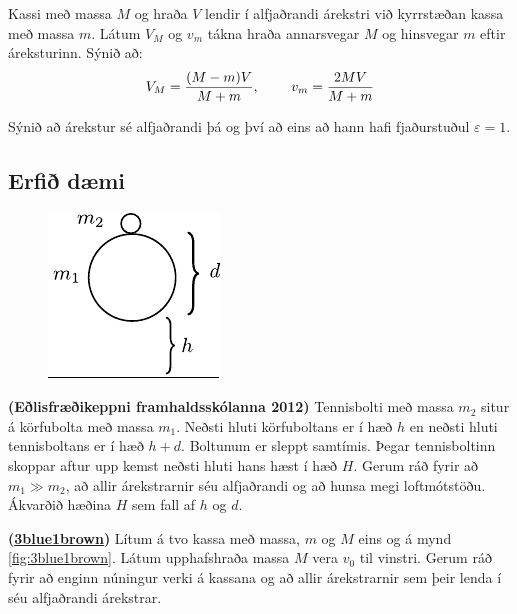 \ifdefined \wholebook \else\documentclass[oneside]{book}\usepackage{EdlBook}\graphicspath{{figures/}}
\begin{document}
\begin{enumerate}[label = \textbf{Dæmi \thechapter.\arabic*.}]
\item Kassi með massa $M$ og hraða $V$ lendir í alfjaðrandi árekstri við kyrrstæðan kassa með massa $m$. Látum $V_M$ og $v_m$ tákna hraða annarsvegar $M$ og hinsvegar $m$ eftir áreksturinn. Sýnið að:
\begin{align*}
    V_M = \frac{(M-m)V}{M+m}, \hspace{0.8cm} v_m = \frac{2MV}{M + m}
\end{align*}

\item Sýnið að árekstur sé alfjaðrandi þá og því að eins að hann hafi fjaðurstuðul $\varepsilon = 1$.

\newpage

\subsection*{Erfið dæmi}

\begin{minipage}{\linewidth}
\begin{figure}
\centering
\vspace{-1cm}
\includegraphics{figures/highflying.pdf}
   \label{fig:ipho1966}
\end{figure}

\item \textbf{(Eðlisfræðikeppni framhaldsskólanna 2012)} Tennisbolti með massa $m_2$ situr á körfubolta með massa $m_1$. Neðsti hluti körfuboltans er í hæð $h$ en neðsti hluti tennisboltans er í hæð $h + d$. Boltunum er sleppt samtímis. Þegar tennisboltinn skoppar aftur upp kemst neðsti hluti hans hæst í hæð $H$. Gerum ráð fyrir að $m_1 \gg m_2$, að allir árekstrarnir séu alfjaðrandi og að hunsa megi loftmótstöðu. Ákvarðið hæðina $H$ sem fall af $h$ og $d$.
\end{minipage}

\vspace{0.5cm}

\item \textbf{(\href{https://youtu.be/HEfHFsfGXjs}{3blue1brown})} Lítum á tvo kassa með massa, $m$ og $M$ eins og á mynd \ref{fig:3blue1brown}. Látum upphafshraða massa $M$ vera $v_0$ til vinstri. Gerum ráð fyrir að enginn núningur verki á kassana og að allir árekstrarnir sem þeir lenda í séu alfjaðrandi árekstrar.


\end{enumerate}
\end{document}
